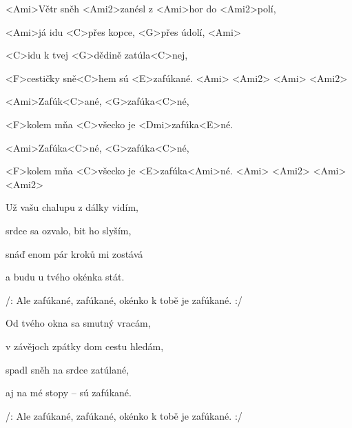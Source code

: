

\zs
<Ami>Větr sněh <Ami2>zanésl z <Ami>hor do <Ami2>polí,

<Ami>já idu <C>přes kopce, <G>přes údolí, <Ami>

<C>idu k tvej <G>dědině zatúla<C>nej,

<F>cestičky sně<C>hem sú <E>zafúkané.
<Ami> <Ami2> <Ami> <Ami2>
\ks

\zr
<Ami>Zafúk<C>ané, <G>zafúka<C>né,

<F>kolem mňa <C>všecko je <Dmi>zafúka<E>né.

<Ami>Zafúka<C>né, <G>zafúka<C>né,

<F>kolem mňa <C>všecko je <E>zafúka<Ami>né.
<Ami> <Ami2> <Ami> <Ami2>
\kr

\zs
Už vašu chalupu z dálky vidím,

srdce sa ozvalo, bit ho slyším,

snáď enom pár kroků mi zostává

a budu u tvého okénka stát.
\ks

\zr
/: Ale zafúkané, zafúkané, okénko k tobě je zafúkané. :/
\kr

\zs
Od tvého okna sa smutný vracám,

v závějoch zpátky dom cestu hledám,

spadl sněh na srdce zatúlané,

aj na mé stopy -- sú zafúkané.
\ks

\zr
/: Ale zafúkané, zafúkané, okénko k tobě je zafúkané. :/
\kr







\kp
